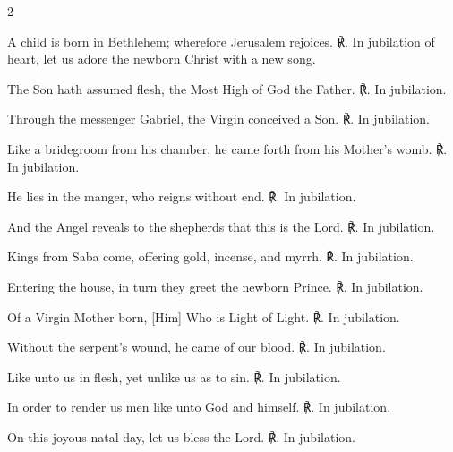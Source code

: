 \begin{multicols}{2}
\raggedcolumns
\begin{enpars}

A child is born in Bethlehem; wherefore Jerusalem rejoices. ℟. In jubilation of heart, let us adore the newborn Christ with a new song.

The Son hath assumed flesh, the Most High of God the Father. ℟. In jubilation.

Through the messenger Gabriel, the Virgin conceived a Son. ℟. In jubilation.

Like a bridegroom from his chamber, he came forth from his Mother’s womb. ℟. In jubilation.

He lies in the manger, who reigns without end. ℟. In jubilation.

And the Angel reveals to the shepherds that this is the Lord. ℟. In jubilation.

Kings from Saba come, offering gold, incense, and myrrh. ℟. In jubilation.

Entering the house, in turn they greet the newborn Prince. ℟. In jubilation.

Of a Virgin Mother born, [Him] Who is Light of Light. ℟. In jubilation.

Without the serpent’s wound, he came of our blood. ℟. In jubilation.

Like unto us in flesh, yet unlike us as to sin. ℟. In jubilation.

In order to render us men like unto God and himself. ℟. In jubilation.

On this joyous natal day, let us bless the Lord. ℟. In jubilation.
\end{enpars}
\end{multicols}